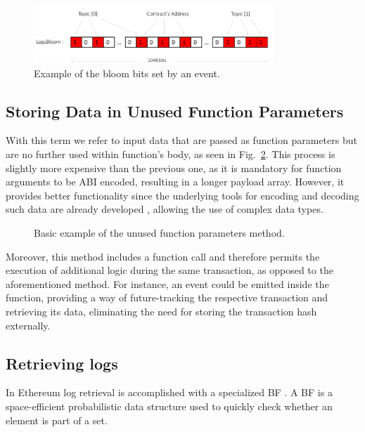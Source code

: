 \begin{figure}[htbp]
\centerline{\includegraphics[width=9cm]{figs/bloom.pdf}}
\caption{Example of the bloom bits set by an event.}
\label{fig: bloom}
\end{figure}

\subsection{Storing Data in Unused Function Parameters}\label{subsection:}
With this term we refer to input data that are passed as function parameters but are no further used within function’s body, as seen in Fig.~\ref{fig:un}. This process is slightly more expensive than the previous one, as it is mandatory for function arguments to be ABI encoded, resulting in a longer payload array. However, it provides better functionality since the underlying tools for encoding and decoding such data are already developed  \citep{web3}, allowing the use of complex data types.

\begin{figure}[htbp]
\setlength{\fboxsep}{5pt}%
\setlength{\fboxrule}{0.05pt}%
\centerline{}
\caption{Basic example of the unused function parameters method.}
\label{fig:un}
\end{figure}

Moreover, this method includes a function call and therefore permits the execution of additional logic during the same transaction, as opposed to the aforementioned method. For instance, an event could be emitted inside the function, providing a way of future-tracking the respective transaction and retrieving its data, eliminating the need for storing the transaction hash externally.

\subsection{Retrieving logs}\label{subsection:}
In Ethereum log retrieval is accomplished with a specialized BF  \citep{wood_2014}. A BF  \citep{broder_2004} is a space-efficient probabilistic data structure used to quickly check whether an element is part of a set. 

